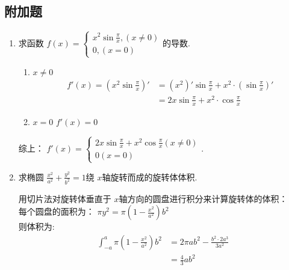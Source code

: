 \documentclass[answers]{exam}
\begin{document}
\begin{questions}
	\section*{附加题}
	\question
	\begin{enumerate}[label=(\arabic*)]
		\item 求函数 \( f(x) = \begin{cases}
			      x^2\sin\frac{\pi}{x}, (x \neq 0) \\
			      0, (x=0)
		      \end{cases} \)的导数.

		      \begin{solution}
			      \begin{enumerate}[label=\arabic*)]
				      \item \( x \neq 0 \)
				            \begin{align*}
					            f'(x) = (x^2\sin\frac{\pi}{x})' & = (x^2)'\sin\frac{\pi}{x} + x^2\cdot(\sin\frac{\pi}{x})' \\
					                                            & = 2x\sin\frac{\pi}{x} + x^2\cdot\cos\frac{\pi}{x}
				            \end{align*}
				      \item \( x = 0 \)
				            \begin{math}
					            f'(x) = 0
				            \end{math}
			      \end{enumerate}
			      综上：
			      \begin{math}
				      f'(x) =
				      \begin{cases}
					      2x\sin\frac{\pi}{x} + x^2\cos\frac{\pi}{x} (x \neq 0) \\
					      0 (x = 0)
				      \end{cases}.
			      \end{math}
		      \end{solution}

		\item 求椭圆 \( \frac{x^2}{a^2} + \frac{y^2}{b^2} = 1 \)绕 $x$轴旋转而成的旋转体体积.
		      \begin{solution}
			      用切片法对旋转体垂直于 \( x \)轴方向的圆盘进行积分来计算旋转体的体积：\\
			      每个圆盘的面积为： \( \pi y^2 = \pi (1-\frac{x^2}{a^2})b^2 \) \\
			      则体积为:
			      \begin{align*}
				      \int_{-a}^{a}\pi(1-\frac{x^2}{a^2})b^2 & = 2\pi ab^2 - \frac{b^2\cdot 2a^3}{3a^2} \\
				                                             & = \frac{4}{3}ab^2
			      \end{align*}

		      \end{solution}

	\end{enumerate}

\end{questions}
\end{document}
